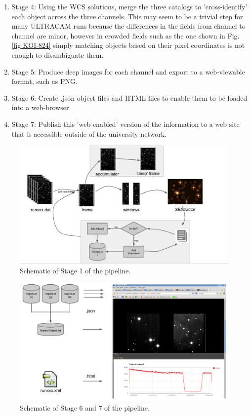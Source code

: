 \begin{enumerate}
	\item Stage 4: Using the WCS solutions, merge the three catalogs to 'cross-identify' each object across the three channels. This may seem to be a trivial step for many ULTRACAM runs because the differences in the fields from channel to channel are minor, however in crowded fields such as the one shown in Fig. \ref{fig:KOI-824} simply matching objects based on their pixel coordinates is not enough to disambiguate them.
	\item Stage 5: Produce deep images for each channel and export to a web-viewable format, such as PNG. 
	\item Stage 6: Create .json object files and HTML files to enable them to be loaded into a web-browser.
	\item Stage 7: Publish this 'web-enabled' version of the information to a web site that is accessible outside of the university network.  
		
\end{enumerate}

\begin{figure}[!h]
	\centering
	\includegraphics[width=130mm]{images/flowchart.png}
	\caption{Schematic of Stage 1 of the pipeline.}
	\label{flowchart}
\end{figure}


\begin{figure}[!h]
	\centering
	\includegraphics[width=130mm]{images/webpublish.png}
	\caption{Schematic of Stage 6 and 7 of the pipeline.}
	\label{webpublish}
\end{figure}

